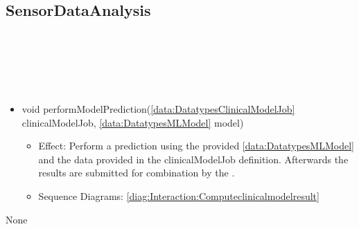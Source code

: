   \subsection{SensorDataAnalysis}\label{int:InterfacesSensorDataAnalysis}
    \begin{description}
      \item[Provided by:] \iconcomponent{}~
      \item[Required by:] \iconcomponent{}~ 
      \item[Operations:] ~
    \begin{itemize}[noitemsep,nolistsep,leftmargin=-.25cm]
      \item \textsf{void performModelPrediction(\ref{data:DatatypesClinicalModelJob} clinicalModelJob, \ref{data:DatatypesMLModel} model)}
        \begin{itemize}[noitemsep,nolistsep]
           \item Effect: Perform a prediction using the provided \ref{data:DatatypesMLModel} and the data provided in the clinicalModelJob definition.
Afterwards the results are submitted for combination by the . 
           \item Sequence Diagrams: \cref{diag:Interaction:Computeclinicalmodelresult}
        \end{itemize}
    \end{itemize}
      \item[Diagrams:] None
    \end{description}

